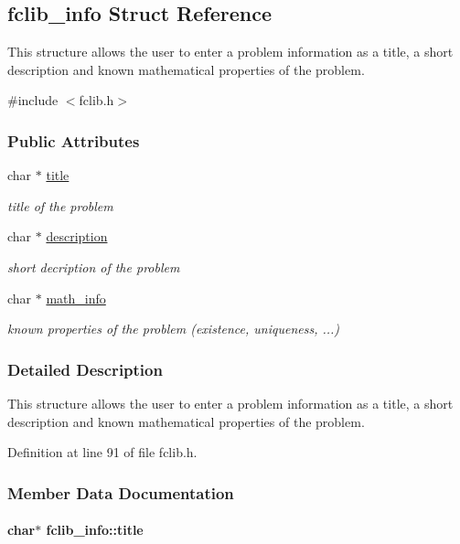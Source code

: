 \hypertarget{structfclib__info}{\subsection{fclib\-\_\-info Struct Reference}
\label{structfclib__info}
}


This structure allows the user to enter a problem information as a title, a short description and known mathematical properties of the problem.  




{\ttfamily \#include $<$fclib.\-h$>$}

\subsubsection*{Public Attributes}
\begin{DoxyCompactItemize}
\item 
char $\ast$ \hyperlink{structfclib__info_a4ea1b298e3aa7228a5f2a55f711f41d2}{title}
\begin{DoxyCompactList}\small\item\em title of the problem \end{DoxyCompactList}\item 
char $\ast$ \hyperlink{structfclib__info_a0c1680fee67eaf7b20c436a775d4f35d}{description}
\begin{DoxyCompactList}\small\item\em short decription of the problem \end{DoxyCompactList}\item 
char $\ast$ \hyperlink{structfclib__info_ad6dadb3af34a719e5ec3cab2d499c7f2}{math\-\_\-info}
\begin{DoxyCompactList}\small\item\em known properties of the problem (existence, uniqueness, ...) \end{DoxyCompactList}\end{DoxyCompactItemize}


\subsubsection{Detailed Description}
This structure allows the user to enter a problem information as a title, a short description and known mathematical properties of the problem. 

Definition at line 91 of file fclib.\-h.



\subsubsection{Member Data Documentation}
\hypertarget{structfclib__info_a4ea1b298e3aa7228a5f2a55f711f41d2}{
\paragraph[{title}]{\setlength{\rightskip}{0pt plus 5cm}char$\ast$ fclib\-\_\-info\-::title}}\label{structfclib__info_a4ea1b298e3aa7228a5f2a55f711f41d2}


